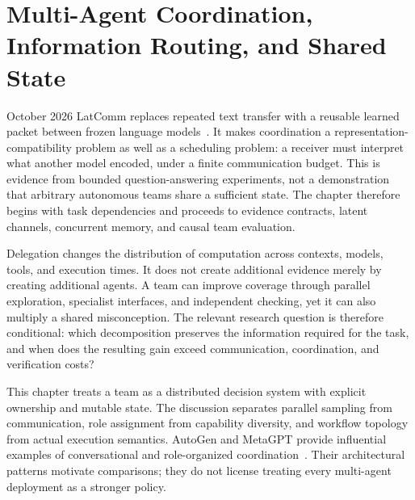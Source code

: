 \chapter{Multi-Agent Coordination, Information Routing, and Shared State}\label{ch:C21}
October 2026 LatComm replaces repeated text transfer with a reusable learned packet between frozen language models~\cite{lin2026latcomm}. It makes coordination a representation-compatibility problem as well as a scheduling problem: a receiver must interpret what another model encoded, under a finite communication budget. This is evidence from bounded question-answering experiments, not a demonstration that arbitrary autonomous teams share a sufficient state. The chapter therefore begins with task dependencies and proceeds to evidence contracts, latent channels, concurrent memory, and causal team evaluation.

Delegation changes the distribution of computation across contexts, models, tools, and execution times. It does not create additional evidence merely by creating additional agents. A team can improve coverage through parallel exploration, specialist interfaces, and independent checking, yet it can also multiply a shared misconception. The relevant research question is therefore conditional: which decomposition preserves the information required for the task, and when does the resulting gain exceed communication, coordination, and verification costs?

This chapter treats a team as a distributed decision system with explicit ownership and mutable state. The discussion separates parallel sampling from communication, role assignment from capability diversity, and workflow topology from actual execution semantics. AutoGen and MetaGPT provide influential examples of conversational and role-organized coordination~\cite{wu2023autogen,hong2023metagpt}. Their architectural patterns motivate comparisons; they do not license treating every multi-agent deployment as a stronger policy.









